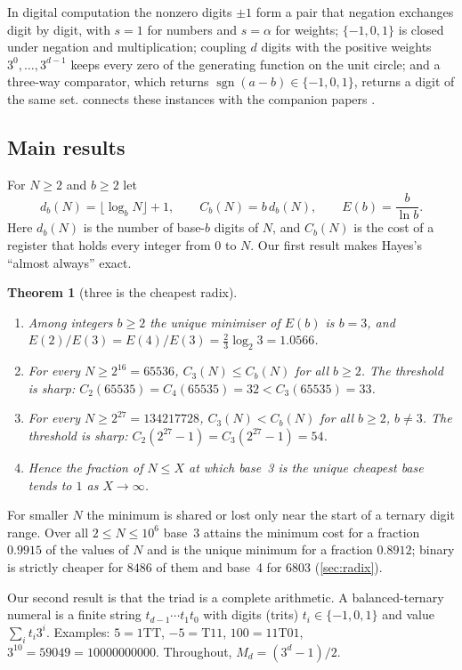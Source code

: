 \documentclass[11pt]{article}
\newtheorem{theorem}{Theorem}[section]
\theoremstyle{definition}\newtheorem{definition}[theorem]{Definition}
\theoremstyle{remark}\newtheorem{remark}[theorem]{Remark}
\newcommand{\T}{\mathrm{T}}
\newcommand{\sgn}{\operatorname{sgn}}
\begin{document}
In digital computation the nonzero digits $\pm1$ form a pair that negation exchanges digit by digit, with $s=1$ for numbers and $s=\alpha$ for weights; $\{-1,0,1\}$ is closed under negation and multiplication; coupling $d$ digits with the positive weights $3^0,\dots,3^{d-1}$ keeps every zero of the generating function on the unit circle; and a three-way comparator, which returns $\sgn(a-b)\in\{-1,0,1\}$, returns a digit of the same set.  connects these instances with the companion papers \cite{SMath,SQuant,SNeuro,SSynth}.

\subsection{Main results}
For $N\ge2$ and $b\ge2$ let
\[
d_b(N)=\lfloor\log_b N\rfloor+1,\qquad C_b(N)=b\,d_b(N),\qquad E(b)=\frac{b}{\ln b}.
\]
Here $d_b(N)$ is the number of base-$b$ digits of $N$, and $C_b(N)$ is the cost of a register that holds every integer from $0$ to $N$. Our first result makes Hayes's ``almost always'' exact.

\begin{theorem}[three is the cheapest radix]\label{thm:eventual}
\leavevmode
\begin{enumerate}[label=\textup{(\alph*)}]
\item Among integers $b\ge2$ the unique minimiser of $E(b)$ is $b=3$, and $E(2)/E(3)=E(4)/E(3)=\frac23\log_{2}3=1.0566$.
\item For every $N\ge2^{16}=65536$, $C_3(N)\le C_b(N)$ for all $b\ge2$. The threshold is sharp: $C_2(65535)=C_4(65535)=32<C_3(65535)=33$.
\item For every $N\ge2^{27}=134217728$, $C_3(N)<C_b(N)$ for all $b\ge2$, $b\ne3$. The threshold is sharp: $C_2(2^{27}-1)=C_3(2^{27}-1)=54$.
\item Hence the fraction of $N\le X$ at which base~3 is the unique cheapest base tends to $1$ as $X\to\infty$.
\end{enumerate}
\end{theorem}

For smaller $N$ the minimum is shared or lost only near the start of a ternary digit range. Over all $2\le N\le10^6$ base~3 attains the minimum cost for a fraction $0.9915$ of the values of $N$ and is the unique minimum for a fraction $0.8912$; binary is strictly cheaper for $8486$ of them and base~4 for $6803$ (\cref{sec:radix}).

Our second result is that the triad is a complete arithmetic. A balanced-ternary numeral is a finite string $t_{d-1}\cdots t_1t_0$ with digits (trits) $t_i\in\{-1,0,1\}$ and value $\sum_i t_i3^i$. Examples: $5=1\T\T$, $-5=\T11$, $100=11\T01$, $3^{10}=59049=10000000000$. Throughout, $M_d=(3^d-1)/2$.
\end{document}
